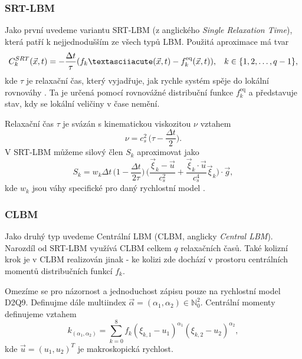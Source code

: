 \subsubsection{SRT-LBM}\label{SRT}
Jako první uvedeme variantu SRT-LBM (z anglického \textit{Single Relaxation Time}), která patří k nejjednodušším ze všech typů LBM. Použitá aproximace má tvar
\begin{equation}\label{eq:srt}
C^{SRT}_{k}(\vec{x}, t) = -  \frac{\Delta t}{\tau}(f_{k}´(\vec{x}, t) - f^{\mathrm{eq}}_{k}(\vec{x}, t)), \hspace{3mm} k \in \{1, 2, \dots, q-1\},
\end{equation}
kde $ \tau $ je relaxační čas, který vyjadřuje, jak rychle systém spěje do lokální rovnováhy \cite{GeierCuLBM}. Ta je určená pomocí rovnovážné distribuční funkce $ f^{\mathrm{eq}}_{k} $ a představuje stav, kdy se lokální veličiny v čase nemění.

Relaxační čas $ \tau $ je svázán s kinematickou viskozitou $ \nu $ vztahem
\begin{equation}\label{eq:tausrt}
\nu = c^{2}_{s} \, \Bigg( \tau - \frac{\Delta t}{2} \Bigg).
\end{equation}
V SRT-LBM můžeme silový člen $ S_{k} $ aproximovat jako
\begin{equation}\label{eq:silasrt}
S_{k} = w_{k }\Delta t \, \Bigg( 1 - \frac{\Delta t}{2\tau} \Bigg) \, \Bigg( \frac{\vec{\xi}_{k} - \vec{u}}{c^{2}_{s}} + \frac{\vec{\xi}_{k} \cdot \vec{u}}{c^{4}_{s}} \vec{\xi}_{k} \Bigg) \cdot \vec{g},
\end{equation}
kde $ w_{k } $ jsou váhy specifické pro daný rychlostní model \cite{Kruger}.
\subsubsection{CLBM}\label{CLBM}
Jako druhý typ uvedeme Centrální LBM (CLBM, anglicky \textit{Central LBM}). Narozdíl od SRT-LBM využívá CLBM celkem $ q $ relaxačních časů. Také kolizní krok je v CLBM realizován jinak - ke kolizi zde dochází v prostoru centrálních momentů distribučních funkcí $ f_{k} $. 

Omezíme se pro názornost a jednoduchost zápisu pouze na rychlostní model D2Q9. Definujme dále multiindex $ \vec{\alpha} = (\alpha_{1}, \alpha_{2}) \in \mathbb{N}^2_{0}$. Centrální momenty definujeme vztahem
\begin{equation}\label{eq:centralmoment} k_{(\alpha_{1}, \alpha_{2})} = \sum_{k=0}^{8} f_{k} (\xi_{k,1}  - u_{1})^{\alpha_{1}} (\xi_{k,2}  - u_{2})^{\alpha_{2}},
\end{equation}
kde $ \vec{u} = (u_1, u_2)^T$ je makroskopická rychlost.

